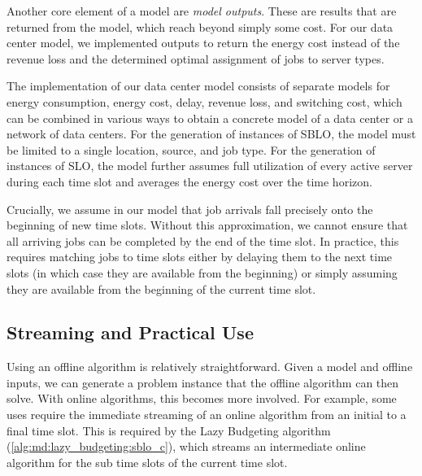 Another core element of a model are \emph{model outputs}. These are results that are returned from the model, which reach beyond simply some cost. For our data center model, we implemented outputs to return the energy cost instead of the revenue loss and the determined optimal assignment of jobs to server types.

The implementation of our data center model consists of separate models for energy consumption, energy cost, delay, revenue loss, and switching cost, which can be combined in various ways to obtain a concrete model of a data center or a network of data centers. For the generation of instances of SBLO, the model must be limited to a single location, source, and job type. For the generation of instances of SLO, the model further assumes full utilization of every active server during each time slot and averages the energy cost over the time horizon.

Crucially, we assume in our model that job arrivals fall precisely onto the beginning of new time slots. Without this approximation, we cannot ensure that all arriving jobs can be completed by the end of the time slot. In practice, this requires matching jobs to time slots either by delaying them to the next time slots (in which case they are available from the beginning) or simply assuming they are available from the beginning of the current time slot.

\subsection{Streaming and Practical Use}\label{section:implementation:architecture:streaming}

Using an offline algorithm is relatively straightforward. Given a model and offline inputs, we can generate a problem instance that the offline algorithm can then solve. With online algorithms, this becomes more involved. For example, some uses require the immediate streaming of an online algorithm from an initial to a final time slot. This is required by the Lazy Budgeting algorithm (\autoref{alg:md:lazy_budgeting:sblo_c}), which streams an intermediate online algorithm for the sub time slots of the current time slot.

